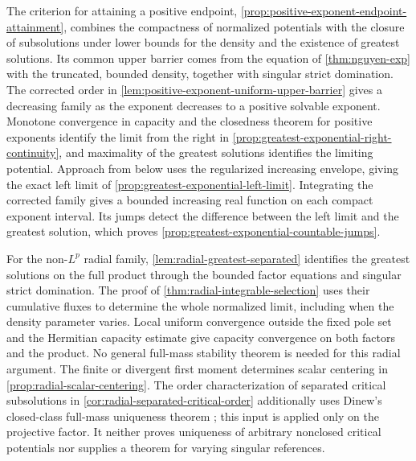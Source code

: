 The criterion for attaining a positive endpoint, \cref{prop:positive-exponent-endpoint-attainment}, combines the compactness of normalized potentials with the closure of subsolutions under lower bounds for the density and the existence of greatest solutions. Its common upper barrier comes from the equation of \cref{thm:nguyen-exp} with the truncated, bounded density, together with singular strict domination. The corrected order in \cref{lem:positive-exponent-uniform-upper-barrier} gives a decreasing family as the exponent decreases to a positive solvable exponent. Monotone convergence in capacity and the closedness theorem for positive exponents identify the limit from the right in \cref{prop:greatest-exponential-right-continuity}, and maximality of the greatest solutions identifies the limiting potential. Approach from below uses the regularized increasing envelope, giving the exact left limit of \cref{prop:greatest-exponential-left-limit}. Integrating the corrected family gives a bounded increasing real function on each compact exponent interval. Its jumps detect the difference between the left limit and the greatest solution, which proves \cref{prop:greatest-exponential-countable-jumps}.

\label{hist:radial-integrable-selection}
For the non-$L^p$ radial family, \cref{lem:radial-greatest-separated} identifies the greatest solutions on the full product through the bounded factor equations and singular strict domination. The proof of \cref{thm:radial-integrable-selection} uses their cumulative fluxes to determine the whole normalized limit, including when the density parameter varies. Local uniform convergence outside the fixed pole set and the Hermitian capacity estimate give capacity convergence on both factors and the product. No general full-mass stability theorem is needed for this radial argument. The finite or divergent first moment determines scalar centering in \cref{prop:radial-scalar-centering}. The order characterization of separated critical subsolutions in \cref{cor:radial-separated-critical-order} additionally uses Dinew's closed-class full-mass uniqueness theorem \cite[arXiv~v1, Theorem~1.2, pp.~2 and 5--8]{DinewUniqueness08}; this input is applied only on the projective factor. It neither proves uniqueness of arbitrary nonclosed critical potentials nor supplies a theorem for varying singular references.

